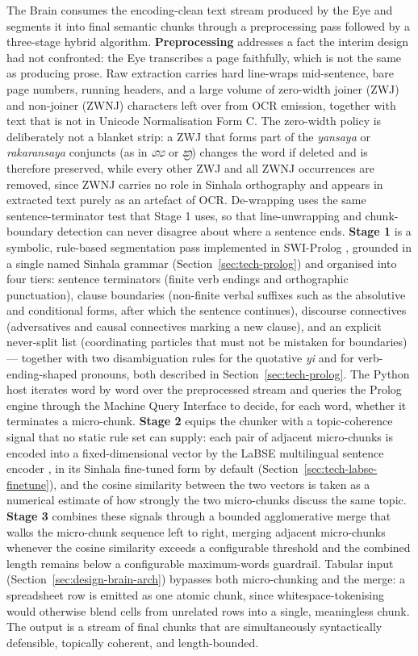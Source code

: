 \documentclass[12pt,a4paper,oneside]{report}
\begin{document}
The Brain consumes the encoding-clean text stream produced by the Eye and segments it into final semantic chunks through a preprocessing pass followed by a three-stage hybrid algorithm. \textbf{Preprocessing} addresses a fact the interim design had not confronted: the Eye transcribes a page faithfully, which is not the same as producing prose. Raw extraction carries hard line-wraps mid-sentence, bare page numbers, running headers, and a large volume of zero-width joiner (ZWJ) and non-joiner (ZWNJ) characters left over from OCR emission, together with text that is not in Unicode Normalisation Form C. The zero-width policy is deliberately not a blanket strip: a ZWJ that forms part of the \textit{yansaya} or \textit{rakaransaya} conjuncts (as in \textit{ශ්‍ය} or \textit{ක්‍ර}) changes the word if deleted and is therefore preserved, while every other ZWJ and all ZWNJ occurrences are removed, since ZWNJ carries no role in Sinhala orthography and appears in extracted text purely as an artefact of OCR. De-wrapping uses the same sentence-terminator test that Stage 1 uses, so that line-unwrapping and chunk-boundary detection can never disagree about where a sentence ends. \textbf{Stage 1} is a symbolic, rule-based segmentation pass implemented in SWI-Prolog \cite{wielemaker2012swiprolog}, grounded in a single named Sinhala grammar (Section~\ref{sec:tech-prolog}) and organised into four tiers: sentence terminators (finite verb endings and orthographic punctuation), clause boundaries (non-finite verbal suffixes such as the absolutive and conditional forms, after which the sentence continues), discourse connectives (adversatives and causal connectives marking a new clause), and an explicit never-split list (coordinating particles that must not be mistaken for boundaries) — together with two disambiguation rules for the quotative \textit{yi} and for verb-ending-shaped pronouns, both described in Section~\ref{sec:tech-prolog}. The Python host iterates word by word over the preprocessed stream and queries the Prolog engine through the Machine Query Interface to decide, for each word, whether it terminates a micro-chunk. \textbf{Stage 2} equips the chunker with a topic-coherence signal that no static rule set can supply: each pair of adjacent micro-chunks is encoded into a fixed-dimensional vector by the LaBSE multilingual sentence encoder \cite{feng2022labse}, in its Sinhala fine-tuned form by default (Section~\ref{sec:tech-labse-finetune}), and the cosine similarity between the two vectors is taken as a numerical estimate of how strongly the two micro-chunks discuss the same topic. \textbf{Stage 3} combines these signals through a bounded agglomerative merge that walks the micro-chunk sequence left to right, merging adjacent micro-chunks whenever the cosine similarity exceeds a configurable threshold and the combined length remains below a configurable maximum-words guardrail. Tabular input (Section~\ref{sec:design-brain-arch}) bypasses both micro-chunking and the merge: a spreadsheet row is emitted as one atomic chunk, since whitespace-tokenising would otherwise blend cells from unrelated rows into a single, meaningless chunk. The output is a stream of final chunks that are simultaneously syntactically defensible, topically coherent, and length-bounded.
\end{document}
